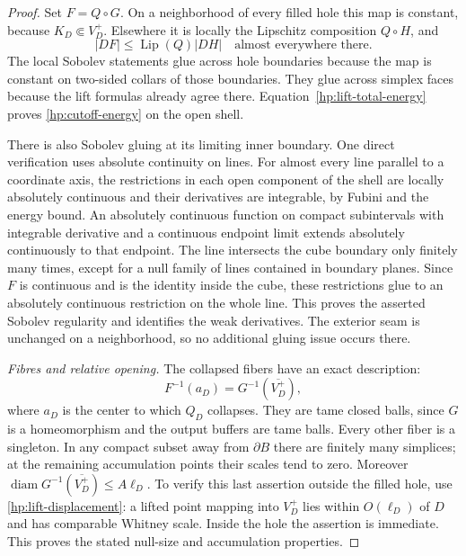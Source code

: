 \documentclass[11pt]{article}
\numberwithin{equation}{section}
\theoremstyle{definition}
\theoremstyle{remark}
\begin{document}
\begin{proof}
Set $F=Q\circ G$.  On a neighborhood of every filled hole this map
is constant, because $K_D\Subset V_D^+$.  Elsewhere it is locally
the Lipschitz composition $Q\circ H$, and
\[
 |DF|\leq\operatorname{Lip}(Q)|DH|\quad\text{almost everywhere there}.
\]
The local Sobolev statements glue across hole boundaries because the
map is constant on two-sided collars of those boundaries.  They glue
across simplex faces because the lift formulas already agree there.
Equation~\eqref{hp:lift-total-energy} proves
\eqref{hp:cutoff-energy} on the open shell.

There is also Sobolev gluing at its limiting inner boundary.  One
direct verification uses absolute continuity on lines.  For almost
every line parallel to a coordinate axis, the restrictions in each
open component of the shell are locally absolutely continuous and
their derivatives are integrable, by Fubini and the energy bound.
An absolutely continuous function on compact subintervals with
integrable derivative and a continuous endpoint limit extends
absolutely continuously to that endpoint.  The line intersects the
cube boundary only finitely many times, except for a null family of
lines contained in boundary planes.  Since $F$ is continuous and is
the identity inside the cube, these restrictions glue to an
absolutely continuous restriction on the whole line.  This proves
the asserted Sobolev regularity and identifies the weak derivatives.
The exterior seam is unchanged on a neighborhood, so no additional
gluing issue occurs there.

\emph{Fibres and relative opening.}
The collapsed fibers have an exact description:
\[
 F^{-1}(a_D)=G^{-1}(\overline{V_D^+}),
\]
where $a_D$ is the center to which $Q_D$ collapses.  They are tame
closed balls, since $G$ is a homeomorphism and the output buffers
are tame balls.  Every other fiber is a singleton.  In any compact
subset away from $\partial B$ there are finitely many simplices;
at the remaining accumulation points their scales tend to zero.
Moreover $\operatorname{diam} G^{-1}(\overline{V_D^+})\leq A\ell_D$.  To verify
this last assertion outside the filled hole, use
\eqref{hp:lift-displacement}: a lifted point mapping into $V_D^+$
lies within $O(\ell_D)$ of $D$ and has comparable Whitney scale.
Inside the hole the assertion is immediate.  This proves the stated
null-size and accumulation properties.


\end{proof}
\end{document}
